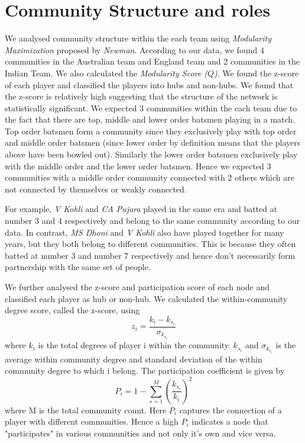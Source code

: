 \documentclass{article}
\begin{document}
\section{Community Structure and roles}
We analysed community structure within the each team using \textit{Modularity Maximization} proposed by \textit{Newman}. According to our data, we found 4 communities in the Australian team and England team and 2 communities in the Indian Team. We also calculated the \textit{Modularity Score ($Q$)}. We found the z-score of each player and classified the players into hubs and non-hubs. We found that the z-score is relatively high suggesting that the structure of the network is statistically significant. We expected 3 communities within the each team due to the fact that there are top, middle and lower order batsmen playing in a match. Top order batsmen form a community since they exclusively play with top order and middle order batsmen (since lower order by definition means that the players above have been bowled out). Similarly the lower order batsmen exclusively play with the middle order and the lower order batsmen. Hence we expected 3 communities with a middle order community connected with 2 others which are not connected by themselves or weakly connected.

For example, \textit{V Kohli} and \textit{CA Pujara} played in the same era and batted at number 3 and 4 respectively and belong to the same community according to our data. In contrast, \textit{MS Dhoni} and \textit{V Kohli} also have played together for many years, but they both belong to different communities. This is because they often batted at number 3 and number 7 respectively and hence don't necessarily form partnership with the same set of people.

We further analysed the z-score and participation score of each node and classified each player as hub or non-hub. We calculated the within-community degree score, called the z-score, using $$z_{i} = \frac{k_i - k_{s_i}}{\sigma_{k_{s_i}}}$$ where $k_i$ is the total degrees of player i within the community. $k_{s_i}$ and $\sigma_{k_{s_i}}$ is the average within community degree and standard deviation of the within community degree to which i belong. The participation coefficient is given by $$P_i = 1 - \sum_{s = 1}^{M}(\frac{k_{s_i}}{k_i})^2$$ where M is the total community count. Here $P_i$ captures the connection of a player with different communities. Hence a high $P_i$ indicates a node that "participates" in various communities and not only it's own and vice versa.
\end{document}
